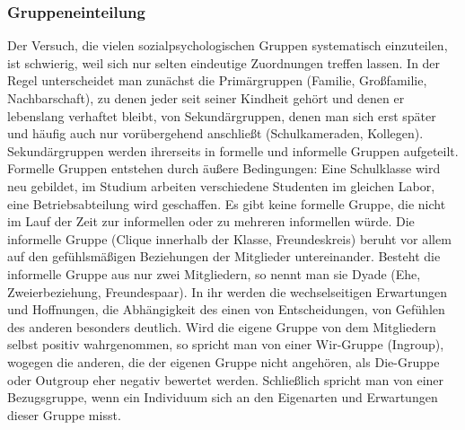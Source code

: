 \documentclass[12pt]{scrartcl}
\begin{document}
\subsubsection{Gruppeneinteilung}
Der Versuch, die vielen sozialpsychologischen Gruppen systematisch einzuteilen,
ist schwierig, weil sich nur selten eindeutige Zuordnungen treffen lassen. In
der Regel unterscheidet man zunächst die Primärgruppen (Familie, Großfamilie,
Nachbarschaft), zu denen jeder seit seiner Kindheit gehört und denen er
lebenslang verhaftet bleibt, von Sekundärgruppen, denen man sich erst später
und häufig auch nur vorübergehend anschließt (Schulkameraden, Kollegen).
Sekundärgruppen werden ihrerseits in formelle und informelle Gruppen
aufgeteilt. Formelle Gruppen entstehen durch äußere Bedingungen: Eine
Schulklasse wird neu gebildet, im Studium arbeiten verschiedene Studenten im
gleichen Labor, eine Betriebsabteilung wird geschaffen. Es gibt keine formelle
Gruppe, die nicht im Lauf der Zeit zur informellen oder zu mehreren informellen
würde. Die informelle Gruppe (Clique innerhalb der Klasse, Freundeskreis)
beruht vor allem auf den gefühlsmäßigen Beziehungen der Mitglieder
untereinander. Besteht die informelle Gruppe aus nur zwei Mitgliedern, so nennt
man sie Dyade (Ehe, Zweierbeziehung, Freundespaar). In ihr werden die
wechselseitigen Erwartungen und Hoffnungen, die Abhängigkeit des einen von
Entscheidungen, von Gefühlen des anderen besonders deutlich. Wird die eigene
Gruppe von dem Mitgliedern selbst positiv wahrgenommen, so spricht man von
einer Wir-Gruppe (Ingroup), wogegen die anderen, die der eigenen Gruppe nicht
angehören, als Die-Gruppe oder Outgroup eher negativ bewertet werden.
Schließlich spricht man von einer Bezugsgruppe, wenn ein Individuum sich an den
Eigenarten und Erwartungen dieser Gruppe misst.
\end{document}
